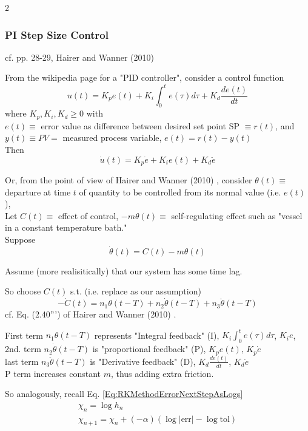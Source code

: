 \documentclass[10pt]{amsart}
\begin{document}
\begin{multicols*}{2}
\subsubsection{PI Step Size Control}

cf. pp. 28-29, Hairer and Wanner (2010) \cite{HaWa2010}

From the wikipedia page for a "PID controller", consider a control function
\[
u(t) = K_p e(t) + K_i \int_0^t e(\tau) d\tau + K_d \frac{de(t)}{dt}
\]
where $K_p, K_i, K_d \geq 0$ with \\
$e(t) \equiv$ error value as difference between desired set point SP $\equiv r(t)$, and \\
$y(t) \equiv PV =$ measured process variable, $e(t) = r(t) - y(t)$ \\

Then
\[
\dot{u}(t) = K_p \dot{e} + K_i e(t) + K_d \ddot{e}
\]

Or, from the point of view of Hairer and Wanner (2010) \cite{HaWa2010}, consider $\theta(t) \equiv$ departure at time $t$ of quantity to be controlled from its normal value (i.e. $e(t)$), \\
Let $C(t) \equiv$ effect of control, $-m\theta(t) \equiv$ self-regulating effect such as "vessel in a constant temperature bath." \\

Suppose
\[
\dot{\theta}(t) = C(t) - m\theta(t)
\]

Assume (more realisitically) that our system has some time lag.

So choose $C(t)$ s.t. (i.e. replace as our assumption)
\[
-\dot{C}(t) = n_1 \theta(t-T) + n_2 \dot{\theta}(t-T) + n_3 \ddot{\theta}(t-T)
\]
cf. Eq. (2.40''') of Hairer and Wanner (2010) \cite{HaWa2010}.

First term $n_1\theta(t-T)$ represents "Integral feedback" (I), $K_i \int_0^t e(\tau) d\tau$, $K_ie$, \\
2nd. term $n_2 \dot{\theta}(t-T)$ is "proportional feedback" (P), $K_pe(t), \, K_p \dot{e}$ \\
last term $n_3 \ddot{\theta}(t-T)$ is "Derivative feedback" (D), $K_d \frac{de(t)}{dt}$, $K_d\ddot{e}$ \\

P term increases constant $m$, thus adding extra friction.

So analogously, recall Eq. \ref{Eq:RKMethodErrorNextStepAsLogs}
\[
\begin{gathered}
\chi_n = \log{h_n} \\
\chi_{n+1} = \chi_n + (-\alpha) (\log{ |\text{err}|} - \log{\text{tol}})	
\end{gathered}
\]


\end{multicols*}
\end{document}
